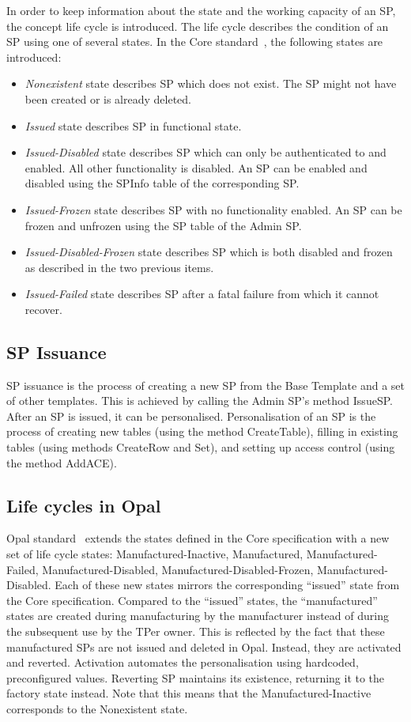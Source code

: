 In order to keep information about the state and the working capacity of an SP, the concept life cycle is introduced. The life cycle describes the condition of an SP using one of several states. In the Core standard~\cite{tcg-storage-core}, the following states are introduced: 
\begin{itemize}
\item \emph{Nonexistent} state describes SP which does not exist. The SP might not have been created or is already deleted.
\item \emph{Issued} state describes SP in functional state.
\item \emph{Issued-Disabled} state describes SP which can only be authenticated to and enabled. All other functionality is disabled. An SP can be enabled and disabled using the SPInfo table of the corresponding SP.
\item \emph{Issued-Frozen} state describes SP with no functionality enabled. An SP can be frozen and unfrozen using the SP table of the Admin SP.
\item \emph{Issued-Disabled-Frozen} state describes SP which is both disabled and frozen as described in the two previous items.
\item \emph{Issued-Failed} state describes SP after a fatal failure from which it cannot recover.
\end{itemize}

\subsection{SP Issuance}

SP issuance is the process of creating a new SP from the Base Template and a set of other templates. This is achieved by calling the Admin SP's method IssueSP. After an SP is issued, it can be personalised. Personalisation of an SP is the process of creating new tables (using the method CreateTable), filling in existing tables (using methods CreateRow and Set), and setting up access control (using the method AddACE).

\subsection{Life cycles in Opal}

Opal standard~\cite{tcg-opal2} extends the states defined in the Core specification with a new set of life cycle states: Manufactured-Inactive, Manufactured, Manufactured-Failed, Manufactured-Disabled, Manufactured-Disabled-Frozen, Manufactured-Disabled. Each of these new states mirrors the corresponding ``issued'' state from the Core specification. Compared to the ``issued'' states, the ``manufactured'' states are created during manufacturing by the manufacturer instead of during the subsequent use by the TPer owner. This is reflected by the fact that these manufactured SPs are not issued and deleted in Opal. Instead, they are activated and reverted. Activation automates the personalisation using hardcoded, preconfigured values. Reverting SP maintains its existence, returning it to the factory state instead. Note that this means that the Manufactured-Inactive corresponds to the Nonexistent state.


